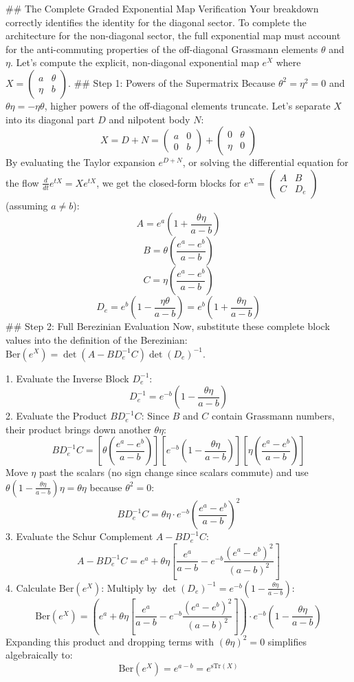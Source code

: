 ## The Complete Graded Exponential Map Verification
Your breakdown correctly identifies the identity for the diagonal sector. To complete the architecture for the non-diagonal sector, the full exponential map must account for the anti-commuting properties of the off-diagonal Grassmann elements $\theta$ and $\eta$.
Let's compute the explicit, non-diagonal exponential map $e^X$ where $X = \begin{pmatrix} a & \theta \\ \eta & b \end{pmatrix}$.
## Step 1: Powers of the Supermatrix
Because $\theta^2 = \eta^2 = 0$ and $\theta\eta = -\eta\theta$, higher powers of the off-diagonal elements truncate. Let's separate $X$ into its diagonal part $D$ and nilpotent body $N$:
$$X = D + N = \begin{pmatrix} a & 0 \\ 0 & b \end{pmatrix} + \begin{pmatrix} 0 & \theta \\ \eta & 0 \end{pmatrix}$$ 
By evaluating the Taylor expansion $e^{D+N}$, or solving the differential equation for the flow $\frac{d}{dt}e^{tX} = X e^{tX}$, we get the closed-form blocks for $e^X = \begin{pmatrix} A & B \\ C & D_e \end{pmatrix}$ (assuming $a \neq b$):
$$A = e^a \left(1 + \frac{\theta\eta}{a-b}\right)$$ 
$$B = \theta \left(\frac{e^a - e^b}{a-b}\right)$$ 
$$C = \eta \left(\frac{e^a - e^b}{a-b}\right)$$ 
$$D_e = e^b \left(1 - \frac{\eta\theta}{a-b}\right) = e^b \left(1 + \frac{\theta\eta}{a-b}\right)$$ 
## Step 2: Full Berezinian Evaluation
Now, substitute these complete block values into the definition of the Berezinian: $\text{Ber}(e^X) = \det(A - B D_e^{-1} C)\det(D_e)^{-1}$.

   1. Evaluate the Inverse Block $D_e^{-1}$:
   $$D_e^{-1} = e^{-b}\left(1 - \frac{\theta\eta}{a-b}\right)$$ 
   2. Evaluate the Product $B D_e^{-1} C$:
   Since $B$ and $C$ contain Grassmann numbers, their product brings down another $\theta\eta$:
   $$B D_e^{-1} C = \left[\theta \left(\frac{e^a - e^b}{a-b}\right)\right] \left[e^{-b}\left(1 - \frac{\theta\eta}{a-b}\right)\right] \left[\eta \left(\frac{e^a - e^b}{a-b}\right)\right]$$ 
   Move $\eta$ past the scalars (no sign change since scalars commute) and use $\theta\left(1 - \frac{\theta\eta}{a-b}\right)\eta = \theta\eta$ because $\theta^2 = 0$:
   $$B D_e^{-1} C = \theta\eta \cdot e^{-b}\left(\frac{e^a - e^b}{a-b}\right)^2$$ 
   3. Evaluate the Schur Complement $A - B D_e^{-1} C$:
   $$A - B D_e^{-1} C = e^a + \theta\eta \left[ \frac{e^a}{a-b} - e^{-b}\frac{(e^a - e^b)^2}{(a-b)^2} \right]$$ 
   4. Calculate $\text{Ber}(e^X)$:
   Multiply by $\det(D_e)^{-1} = e^{-b}\left(1 - \frac{\theta\eta}{a-b}\right)$:
   $$\text{Ber}(e^X) = \left( e^a + \theta\eta \left[ \frac{e^a}{a-b} - e^{-b}\frac{(e^a - e^b)^2}{(a-b)^2} \right] \right) \cdot e^{-b}\left(1 - \frac{\theta\eta}{a-b}\right)$$ 
   Expanding this product and dropping terms with $(\theta\eta)^2 = 0$ simplifies algebraically to:
   $$\text{Ber}(e^X) = e^{a-b} = e^{\text{sTr}(X)}$$ 

